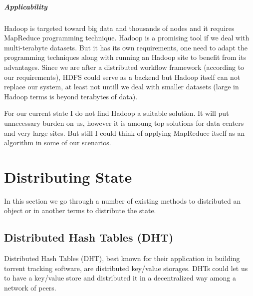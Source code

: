 \subparagraph{Applicability}
Hadoop is targeted toward big data and thousands of nodes and it requires MapReduce\cite{DG04} programming technique.
Hadoop is a promising tool if we deal with multi-terabyte datasets. 
But it has its own requirements, one need to adapt the programming techniques along with 
running an Hadoop site to benefit from its advantages. 
Since we are after a distributed workflow framework (according to our requirements), 
HDFS could serve as a backend but Hadoop itself can not replace our system, 
at least not untill we deal with smaller datasets (large in Hadoop terms is beyond terabytes of data).

For our current state I do not find Hadoop a suitable solution.
It will put unnecessary burden on us, however it is amoung top solutions for data centers and very large sites.
But still I could think of applying MapReduce itself as an algorithm in some of our scenarios.

\section{Distributing State}
In this section we go through a number of existing methods to distributed an object or in another terms to distribute the state.

\subsection{Distributed Hash Tables (DHT)}
Distributed Hash Tables (DHT), best known for their application in building torrent tracking software,
are distributed key/value storages. DHTs could let us to have a key/value store and distributed it in 
a decentralized way among a network of peers.

